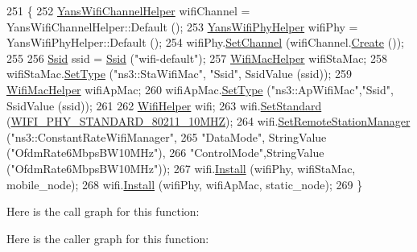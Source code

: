 \begin{DoxyCode}
251 \{
252   \hyperlink{classns3_1_1YansWifiChannelHelper}{YansWifiChannelHelper} wifiChannel = YansWifiChannelHelper::Default ();
253   \hyperlink{classns3_1_1YansWifiPhyHelper}{YansWifiPhyHelper} wifiPhy = YansWifiPhyHelper::Default ();
254   wifiPhy.\hyperlink{classns3_1_1YansWifiPhyHelper_ad2e9a27587dd4ff320435c93cc2676de}{SetChannel} (wifiChannel.\hyperlink{classns3_1_1YansWifiChannelHelper_a0532e292ab9452f3cf630c848708e563}{Create} ());
255 
256   \hyperlink{classns3_1_1Ssid}{Ssid} ssid = \hyperlink{classns3_1_1Ssid}{Ssid} (\textcolor{stringliteral}{"wifi-default"});
257   \hyperlink{classns3_1_1WifiMacHelper}{WifiMacHelper} wifiStaMac;
258   wifiStaMac.\hyperlink{classns3_1_1WifiMacHelper_a382d8df76a1dd7007179d1963b4b6bc6}{SetType} (\textcolor{stringliteral}{"ns3::StaWifiMac"}, \textcolor{stringliteral}{"Ssid"}, SsidValue (ssid));
259   \hyperlink{classns3_1_1WifiMacHelper}{WifiMacHelper} wifiApMac;
260   wifiApMac.\hyperlink{classns3_1_1WifiMacHelper_a382d8df76a1dd7007179d1963b4b6bc6}{SetType} (\textcolor{stringliteral}{"ns3::ApWifiMac"},\textcolor{stringliteral}{"Ssid"}, SsidValue (ssid));
261 
262   \hyperlink{classns3_1_1WifiHelper}{WifiHelper} wifi;
263   wifi.\hyperlink{classns3_1_1WifiHelper_aa54f3e61527ef8de318d310045bc5dfd}{SetStandard} (\hyperlink{group__wifi_gga1299834f4e1c615af3ca738033b76a49aff863c98db467eb76170dc8bbe743de7}{WIFI\_PHY\_STANDARD\_80211\_10MHZ});
264   wifi.\hyperlink{classns3_1_1WifiHelper_a3d01b178aeb2de246ab5a3aa5638ce24}{SetRemoteStationManager} (\textcolor{stringliteral}{"ns3::ConstantRateWifiManager"},
265                                 \textcolor{stringliteral}{"DataMode"}, StringValue (\textcolor{stringliteral}{"OfdmRate6MbpsBW10MHz"}),
266                                 \textcolor{stringliteral}{"ControlMode"},StringValue (\textcolor{stringliteral}{"OfdmRate6MbpsBW10MHz"}));
267   wifi.\hyperlink{classns3_1_1WifiHelper_a451b3d33fa1497c22f06c5451f57a127}{Install} (wifiPhy, wifiStaMac, mobile\_node);
268   wifi.\hyperlink{classns3_1_1WifiHelper_a451b3d33fa1497c22f06c5451f57a127}{Install} (wifiPhy, wifiApMac, static\_node);
269 \}
\end{DoxyCode}


Here is the call graph for this function\+:




Here is the caller graph for this function\+:


